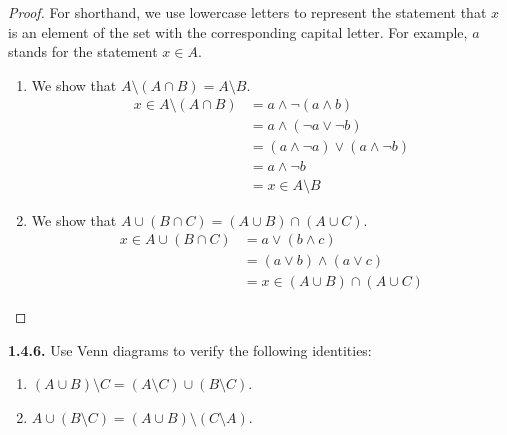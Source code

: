 \documentclass[12pt]{amsart}
\newenvironment{statement}[1]{\smallskip\noindent\color[rgb]{.6627, .3529, .6314} {\bf #1.}}{}
\theoremstyle{definition}
\theoremstyle{remark}
\begin{document}
\begin{proof}
For shorthand, we use lowercase letters to represent the statement that $x$ is an element of the set with the corresponding capital letter.
For example, $a$ stands for the statement $x \in A$.
\begin{enumerate}
	\item We show that $A \setminus (A \cap B) = A \setminus B$.
	\begin{align*}
		x \in A \setminus (A \cap B)
		&= a \wedge \neg (a \wedge b) \\
		&= a \wedge (\neg a \vee \neg b) \\
		&= (a \wedge \neg a) \vee (a \wedge \neg b) \\
		&= a \wedge \neg b \\
		&= x \in A \setminus B
	\end{align*}
	
	\item We show that $A \cup (B \cap C) = (A \cup B) \cap (A \cup C)$.
	\begin{align*}
		x \in A \cup (B \cap C)
		&= a \vee (b \wedge c) \\
		&= (a \vee b) \wedge (a \vee c) \\
		&= x \in (A \cup B) \cap (A \cup C)
	\end{align*}
\end{enumerate}
\end{proof}


\begin{statement}{1.4.6}
Use Venn diagrams to verify the following identities:
\begin{enumerate}
	\item $(A \cup B) \setminus C = (A \setminus C) \cup (B \setminus C)$.
	\item $A \cup (B \setminus C) = (A \cup B) \setminus (C \setminus A)$.
\end{enumerate}
\end{statement}
\end{document}
